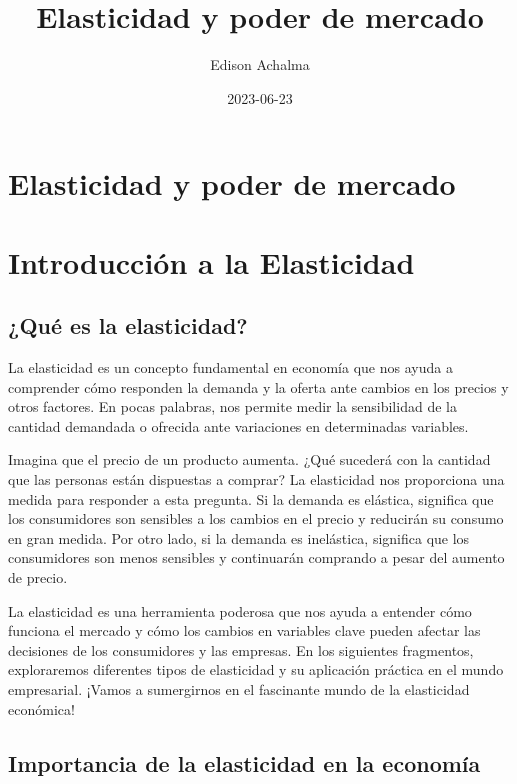 \documentclass[
  jou,
  floatsintext,
  longtable,
  a4paper,
  nolmodern,
  notxfonts,
  notimes,
  12pt,
  colorlinks=true,linkcolor=blue,citecolor=blue,urlcolor=blue]{apa7}
\title{Elasticidad y poder de mercado}
\author{Edison Achalma}
\affiliation{
{Escuela Profesional de Economía, Universidad Nacional de San Cristóbal
de Huamanga}}
\date{2023-06-23}
\begin{document}
\maketitle


\hypertarget{toc}{}
\tableofcontents
\newpage
\section[Introduction]{Elasticidad y poder de mercado}

\setcounter{secnumdepth}{3}

\setlength\LTleft{0pt}




\section{Introducción a la
Elasticidad}\label{introducciuxf3n-a-la-elasticidad}

\subsection{¿Qué es la elasticidad?}\label{quuxe9-es-la-elasticidad}

La elasticidad es un concepto fundamental en economía que nos ayuda a
comprender cómo responden la demanda y la oferta ante cambios en los
precios y otros factores. En pocas palabras, nos permite medir la
sensibilidad de la cantidad demandada o ofrecida ante variaciones en
determinadas variables.

Imagina que el precio de un producto aumenta. ¿Qué sucederá con la
cantidad que las personas están dispuestas a comprar? La elasticidad nos
proporciona una medida para responder a esta pregunta. Si la demanda es
elástica, significa que los consumidores son sensibles a los cambios en
el precio y reducirán su consumo en gran medida. Por otro lado, si la
demanda es inelástica, significa que los consumidores son menos
sensibles y continuarán comprando a pesar del aumento de precio.

La elasticidad es una herramienta poderosa que nos ayuda a entender cómo
funciona el mercado y cómo los cambios en variables clave pueden afectar
las decisiones de los consumidores y las empresas. En los siguientes
fragmentos, exploraremos diferentes tipos de elasticidad y su aplicación
práctica en el mundo empresarial. ¡Vamos a sumergirnos en el fascinante
mundo de la elasticidad económica!

\subsection{Importancia de la elasticidad en la
economía}\label{importancia-de-la-elasticidad-en-la-economuxeda}
\end{document}
